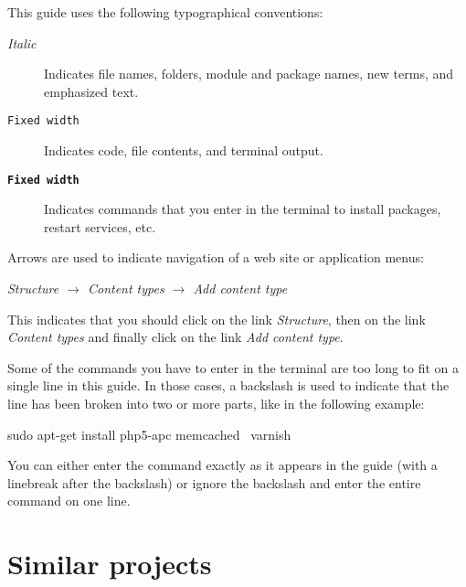 \documentclass[final,ebook,10pt,twoside,openright]{memoir}
\begin{document}
\begingroup
\setlength{\parindent}{0pt}

This guide uses the following typographical conventions:

\begin{squashboxsnugshade}
\begin{description}
\item[\normalfont\emph{Italic}] Indicates file names, folders, module and package names, new terms, and emphasized text.
\item[\normalfont\texttt{Fixed width}] Indicates code, file contents, and terminal output.
\item[\normalfont\textbf{\texttt{Fixed width}}] Indicates commands that you enter in the terminal to install packages, restart services, etc.
\end{description}
\end{squashboxsnugshade}

Arrows are used to indicate navigation of a web site or application menus:

\begin{squashboxsnugshade}
\emph{Structure $\rightarrow$ Content types $\rightarrow$ Add content type}
\end{squashboxsnugshade}

This indicates that you should click on the link \emph{Structure}, then on the link \emph{Content types} and finally click on the link \emph{Add content type}.


\endgroup

Some of the commands you have to enter in the terminal are too long to fit on a single line in this guide. In those cases, a backslash is used to indicate that the line has been broken into two or more parts, like in the following example:

\begin{squashboxcommand}
sudo apt-get install php5-apc memcached \
  varnish
\end{squashboxcommand}

\noindent
You can either enter the command exactly as it appears in the guide (with a linebreak after the backslash) or ignore the backslash and enter the entire command on one line.

\section*{Similar projects}
\label{sec:Similar projects}
\end{document}

